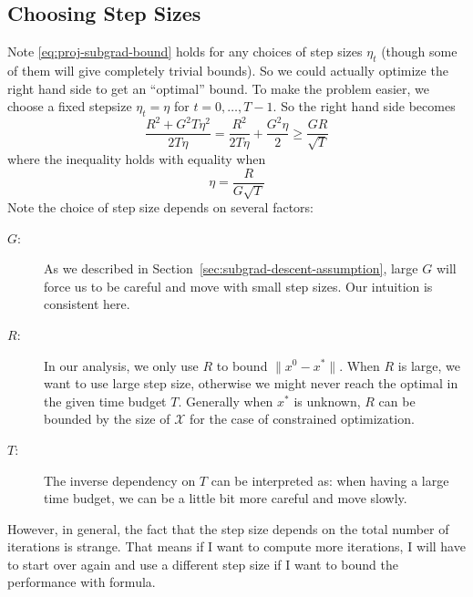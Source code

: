 \documentclass{scrartcl}
\newcommand{\sX}{\mathcal{X}}
\begin{document}
\subsection{Choosing Step Sizes}

Note \eqref{eq:proj-subgrad-bound} holds for any choices of step sizes $\eta_t$ (though some of them
will give completely trivial bounds). So we could actually optimize the right hand side to get an
``optimal'' bound. To make the problem easier, we choose a fixed stepsize $\eta_t=\eta$ for
$t=0,\ldots,T-1$. So the right hand side becomes
\begin{equation}
  \frac{R^2+G^2T\eta^2}{2T\eta} = \frac{R^2}{2T\eta} + \frac{G^2\eta}{2} \geq \frac{GR}{\sqrt{T}}
  \label{eq:subgrad-bound-fix-eta}
\end{equation}
where the inequality holds with equality when
\begin{equation}
  \eta = \frac{R}{G\sqrt{T}}
\end{equation}
Note the choice of step size depends on several factors:
\begin{description}
  \item[$G$:] As we described in Section~\ref{sec:subgrad-descent-assumption}, large $G$ will force
  us to be careful and move with small step sizes. Our intuition is consistent here.
  \item[$R$:] In our analysis, we only use $R$ to bound $\|x^0-x^*\|$. When $R$ is large, we want to
  use large step size, otherwise we might never reach the optimal in the given time budget $T$.
  Generally when $x^*$ is unknown, $R$ can be bounded by the size of $\sX$ for the case
  of constrained optimization.
  \item[$T$:] The inverse dependency on $T$ can be interpreted as: when having a large time budget,
  we can be a little bit more careful and move slowly.
\end{description}


However, in general, the fact that the step size depends on the total number of iterations is
strange. That means if I want to compute more iterations, I will have to start over again and use a
different step size if I want to bound the performance with formula.
\end{document}
